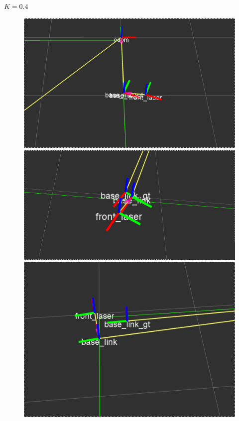 $K = 0.4$

\begin{figure}[!htb]
  \includegraphics[width=\linewidth]{imagenesExpLazoCerrado/k0.4/1.png}
\endminipage\hfill
{}
  \includegraphics[width=\linewidth]{imagenesExpLazoCerrado/k0.4/3.png}
\endminipage\hfill
{}%
  \includegraphics[width=\linewidth]{imagenesExpLazoCerrado/k0.4/5.png}
\endminipage
\end{figure}
\FloatBarrier

